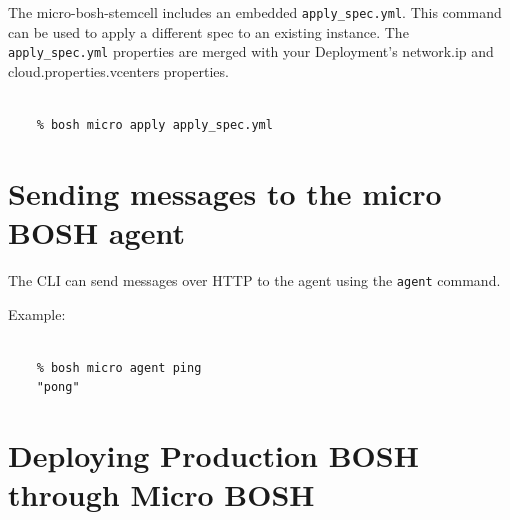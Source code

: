 The micro-bosh-stemcell includes an embedded \texttt{apply\_spec.yml}. This command can be used to apply a different spec to an existing instance. The \texttt{apply\_spec.yml} properties are merged with your Deployment's network.ip and cloud.properties.vcenters properties.

\begin{adjustwidth}{2.5em}{2.5em}
\begin{verbatim}

    % bosh micro apply apply_spec.yml

\end{verbatim}
\end{adjustwidth}

\section{Sending messages to the micro BOSH agent}
\label{sendingmessagestothemicroboshagent}

The CLI can send messages over HTTP to the agent using the \texttt{agent} command.

Example:

\begin{adjustwidth}{2.5em}{2.5em}
\begin{verbatim}

    % bosh micro agent ping
    "pong"

\end{verbatim}
\end{adjustwidth}

\section{Deploying Production BOSH through Micro BOSH}
\label{deployingproductionboshthroughmicrobosh}

